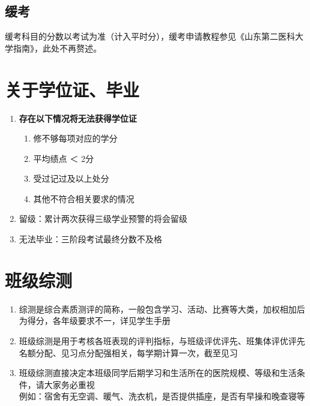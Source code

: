 \subsection[缓考]{缓考}
缓考科目的分数以考试为准（计入平时分），缓考申请教程参见《山东第二医科大学指南》，此处不再赘述。

\section[关于学位证、毕业]{关于学位证、毕业}
\begin{enumerate}
    \item \textbf{存在以下情况将无法获得学位证}
          \begin{enumerate}
              \item 修不够每项对应的学分
              \item 平均绩点 ＜ 2分
              \item 受过记过及以上处分
              \item 其他不符合相关要求的情况
          \end{enumerate}
    \item 留级：累计两次获得三级学业预警的将会留级
    \item 无法毕业：三阶段考试最终分数不及格
\end{enumerate}

\section[班级综测]{班级综测}
\label{class_evaluation}
\begin{enumerate}
    \item 综测是综合素质测评的简称，一般包含学习、活动、比赛等大类，加权相加后为得分，各年级要求不一，详见学生手册
    \item 班级综测是用于考核各班表现的评判指标，与班级评优评先、班集体评优评先名额分配、见习点分配\footnotemark 强相关，每学期计算一次，截至见习
    \item 班级综测直接决定本班级同学后期学习和生活所在的医院规模、等级和生活条件，请大家务必重视\\
          例如：宿舍有无空调、暖气、洗衣机，是否提供插座，是否有早操和晚查寝\footnotemark 等
\end{enumerate}

